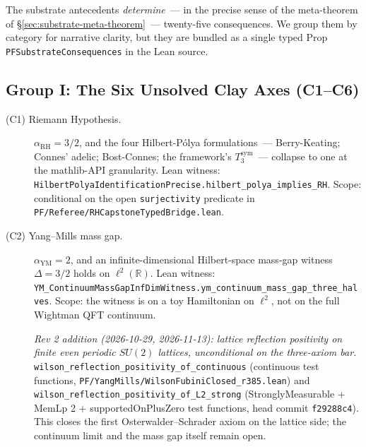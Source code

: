 The substrate antecedents \emph{determine}~--- in the precise
sense of the meta-theorem of \S\ref{sec:substrate-meta-theorem}~---
twenty-five consequences. We group them by category for narrative
clarity, but they are bundled as a single typed Prop
\texttt{PFSubstrateConsequences} in the Lean source.

\subsection{Group I: The Six Unsolved Clay Axes (C1--C6)}
\label{subsec:substrate-consequences-clay}

\begin{description}
\item[\textnormal{(C1) Riemann Hypothesis.}]
$\alpha_{\text{RH}} = 3/2$, and the four Hilbert-P\'olya
formulations~--- Berry-Keating; Connes' adelic; Bost-Connes;
the framework's $T_3^{\text{sym}}$~--- collapse to one at the
mathlib-API granularity. Lean witness:
\texttt{Hilbert\allowbreak{}Polya\allowbreak{}Identification\allowbreak{}Precise.hilbert\_\allowbreak{}polya\_\allowbreak{}implies\_\allowbreak{}RH}.
Scope: conditional on the open \texttt{surjectivity}
predicate in \texttt{PF/\allowbreak{}Referee/\allowbreak{}RHCapstone\allowbreak{}Typed\allowbreak{}Bridge.\allowbreak{}lean}.

\item[\textnormal{(C2) Yang--Mills mass gap.}]
$\alpha_{\text{YM}} = 2$, and an infinite-dimensional
Hilbert-space mass-gap witness $\Delta = 3/2$ holds on
$\ell^2(\mathbb{R})$. Lean witness:
\texttt{YM\_\allowbreak{}Continuum\allowbreak{}Mass\allowbreak{}Gap\allowbreak{}Inf\allowbreak{}Dim\allowbreak{}Witness.ym\_\allowbreak{}continuum\_\allowbreak{}mass\_\allowbreak{}gap\_\allowbreak{}three\_\allowbreak{}halves}.
Scope: the witness is on a toy Hamiltonian on
$\ell^2$, not on the full Wightman QFT continuum.

\emph{Rev 2 addition (2026-10-29, 2026-11-13): lattice reflection
positivity on finite even periodic $SU(2)$ lattices, unconditional
on the three-axiom bar.}
\texttt{wilson\_\allowbreak{}reflection\_\allowbreak{}positivity\_\allowbreak{}of\_\allowbreak{}continuous}
(continuous test functions,
\texttt{PF/\allowbreak{}YangMills/\allowbreak{}WilsonFubiniClosed\_\allowbreak{}r385.lean})
and
\texttt{wilson\_\allowbreak{}reflection\_\allowbreak{}positivity\_\allowbreak{}of\_\allowbreak{}L2\_\allowbreak{}strong}
(StronglyMeasurable + MemLp 2 + supportedOnPlusZero test
functions, head commit \texttt{f29288c4}).  This closes the first
Osterwalder--Schrader axiom on the lattice side; the continuum
limit and the mass gap itself remain open.


\end{description}
